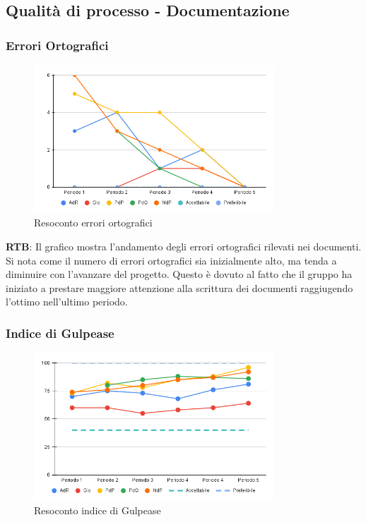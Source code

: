 \subsection{Qualità di processo - Documentazione}

\subsubsection{Errori Ortografici}
\begin{figure}[H]
    \centering
    \includegraphics[width=0.8\textwidth]{../Images/PianoDiQualifica/errori_ortografici.png}
    \caption{Resoconto errori ortografici}
    \label{fig:Errori ortografici}
\end{figure}

\textbf{RTB}: Il grafico mostra l'andamento degli errori ortografici rilevati nei documenti. Si nota come il numero di errori ortografici sia inizialmente alto, ma tenda a diminuire con l'avanzare del progetto. Questo è dovuto al fatto che il gruppo ha iniziato a prestare maggiore attenzione alla scrittura dei documenti raggiugendo l'ottimo nell'ultimo periodo.

\subsubsection{Indice di Gulpease}
\begin{figure}[H]
    \centering
    \includegraphics[width=0.8\textwidth]{../Images/PianoDiQualifica/Gulpease.png}
    \caption{Resoconto indice di Gulpease}
    \label{fig:Indice di Gulpease}
\end{figure}